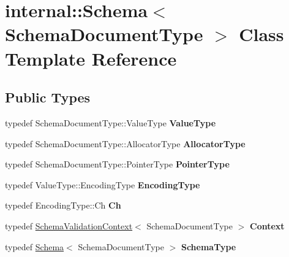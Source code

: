 \hypertarget{classinternal_1_1_schema}{}\section{internal\+:\+:Schema$<$ Schema\+Document\+Type $>$ Class Template Reference}
\label{classinternal_1_1_schema}
\subsection*{Public Types}
\begin{DoxyCompactItemize}
\item 
typedef Schema\+Document\+Type\+::\+Value\+Type {\bfseries Value\+Type}\hypertarget{classinternal_1_1_schema_a8976b6d7e2a885483d0b51d941019340}{}\label{classinternal_1_1_schema_a8976b6d7e2a885483d0b51d941019340}

\item 
typedef Schema\+Document\+Type\+::\+Allocator\+Type {\bfseries Allocator\+Type}\hypertarget{classinternal_1_1_schema_a7af392edd81e610754cd2e6b4f82761c}{}\label{classinternal_1_1_schema_a7af392edd81e610754cd2e6b4f82761c}

\item 
typedef Schema\+Document\+Type\+::\+Pointer\+Type {\bfseries Pointer\+Type}\hypertarget{classinternal_1_1_schema_a13d7dbba6e4a77b10862546777c5aae8}{}\label{classinternal_1_1_schema_a13d7dbba6e4a77b10862546777c5aae8}

\item 
typedef Value\+Type\+::\+Encoding\+Type {\bfseries Encoding\+Type}\hypertarget{classinternal_1_1_schema_a9ea269c3ca8099c2a14b6519fe34efb1}{}\label{classinternal_1_1_schema_a9ea269c3ca8099c2a14b6519fe34efb1}

\item 
typedef Encoding\+Type\+::\+Ch {\bfseries Ch}\hypertarget{classinternal_1_1_schema_a98043fca39adbf8b42e7472e3d80d6fa}{}\label{classinternal_1_1_schema_a98043fca39adbf8b42e7472e3d80d6fa}

\item 
typedef \hyperlink{structinternal_1_1_schema_validation_context}{Schema\+Validation\+Context}$<$ Schema\+Document\+Type $>$ {\bfseries Context}\hypertarget{classinternal_1_1_schema_ac3f54abfefe300c5610c1205869cfd66}{}\label{classinternal_1_1_schema_ac3f54abfefe300c5610c1205869cfd66}

\item 
typedef \hyperlink{classinternal_1_1_schema}{Schema}$<$ Schema\+Document\+Type $>$ {\bfseries Schema\+Type}\hypertarget{classinternal_1_1_schema_ac2556ebf7a7db971e1c1c0f76eb5786e}{}\label{classinternal_1_1_schema_ac2556ebf7a7db971e1c1c0f76eb5786e}


\end{DoxyCompactItemize}
